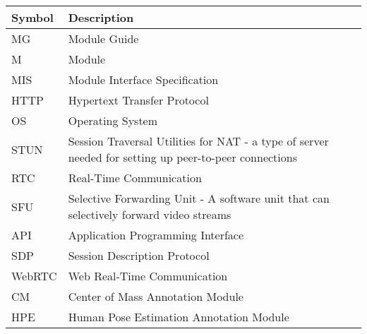 \documentclass[12pt, titlepage]{article}
\begin{document}
\begin{tabularx}{\textwidth}{p{2cm}X}
  \toprule
  {\bf Symbol} & {\bf Description}                                                                                     \\
  \midrule
  MG           & Module Guide                                                                                          \\
  M            & Module                                                                                                \\
  MIS          & Module Interface Specification                                                                        \\
  HTTP         & Hypertext Transfer Protocol                                                                           \\
  OS           & Operating System                                                                                      \\
  STUN         & Session Traversal Utilities for NAT - a type of server needed for setting up peer-to-peer connections \\
  RTC          & Real-Time Communication                                                                               \\
  SFU          & Selective Forwarding Unit - A software unit that can selectively forward video streams                \\
  API          & Application Programming Interface                                                                     \\
  SDP          & Session Description Protocol                                                                          \\
  WebRTC       & Web Real-Time Communication                                                                           \\
  CM           & Center of Mass Annotation Module                                                                      \\
  HPE          & Human Pose Estimation Annotation Module                                                               \\
  \bottomrule
\end{tabularx}

\newpage

\tableofcontents

\newpage
\end{document}
